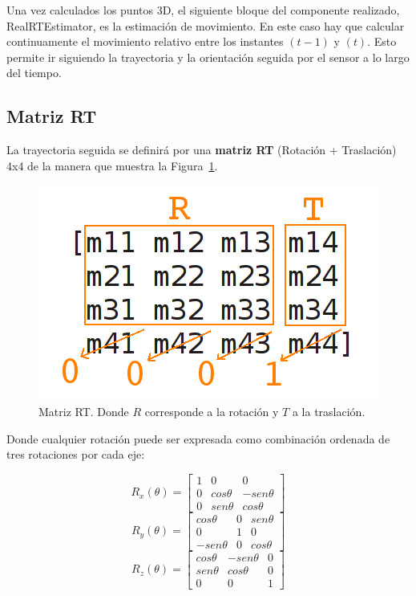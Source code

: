 Una vez calculados los puntos 3D, el siguiente bloque del componente realizado, RealRTEstimator, es la estimación de movimiento. En este caso hay que calcular continuamente el movimiento relativo entre los instantes $(t-1)$ y $(t)$. Esto permite ir siguiendo la trayectoria y la orientación seguida por el sensor a lo largo del tiempo.

\subsection{Matriz RT}

La trayectoria seguida se definirá por una \textbf{matriz RT} (Rotación + Traslación) 4x4 de la manera que muestra la Figura~\ref{fig:matrixRT}.

\begin{figure}[th]
\centering
\includegraphics[scale=0.5]{Figures/matrixRT.png}
\decoRule
\caption[Matriz RT]{Matriz RT. Donde $R$ corresponde a la rotación y $T$ a la traslación.}
\label{fig:matrixRT}
\end{figure}

Donde cualquier rotación puede ser expresada como combinación ordenada de tres rotaciones por cada eje:

\begin{equation}
R_{x}(\theta)=\left[\begin{array}{ccc}
1 & 0 & 0\\
0 & cos\theta & -sen\theta\\
0 & sen\theta & cos\theta
\end{array}\right]
\end{equation}
\begin{equation}
R_{y}(\theta)=\left[\begin{array}{ccc}
cos\theta & 0 & sen\theta\\
0 & 1 & 0\\
-sen\theta & 0 & cos\theta
\end{array}\right]
\end{equation}
\begin{equation}
R_{z}(\theta)=\left[\begin{array}{ccc}
cos\theta & -sen\theta & 0\\
sen\theta & cos\theta & 0\\
0 & 0 & 1
\end{array}\right]
\end{equation}

